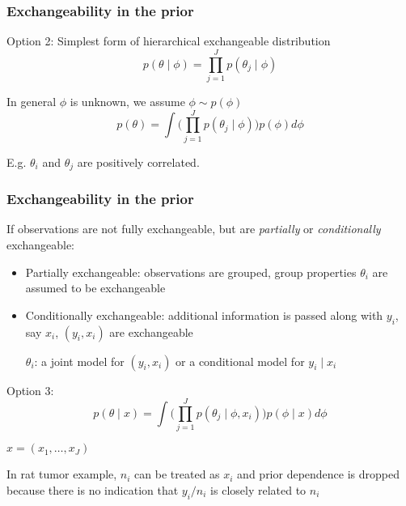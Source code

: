 \documentclass{beamer}
\begin{document}
\begin{frame}
  \frametitle{Exchangeability in the prior}
Option 2: Simplest form of hierarchical exchangeable distribution 
\[
p(\theta \mid \phi) = \prod_{j=1}^J p(\theta_j \mid \phi)
\]

In general $\phi$ is unknown, we assume $\phi \sim p(\phi)$ 
\[
p(\theta) = \int \bigg(\prod_{j=1}^J p(\theta_j \mid \phi)\bigg)
p(\phi) d\phi
\]  

E.g. $\theta_i$ and $\theta_j$ are positively correlated. 
\end{frame}


\begin{frame}
  \frametitle{Exchangeability in the prior}
If observations are not fully exchangeable, but are {\it partially} or
{\it conditionally} exchangeable:

\begin{itemize}
\item Partially exchangeable: observations are grouped, group
  properties $\theta_i$ are assumed to be exchangeable
\item Conditionally exchangeable: additional information is passed
  along with $y_i$, say $x_i$, $(y_i, x_i)$ are exchangeable
 
  $\theta_i$: a joint model for $(y_i, x_i)$ or a conditional model for $y_i \mid x_i$  
\end{itemize}
Option 3: 
\[
p(\theta \mid x) = \int \bigg(\prod_{j=1}^J p(\theta_j \mid \phi, x_i)\bigg)
p(\phi \mid x) d\phi
\]  

$x = (x_1, \ldots, x_J)$

In rat tumor example, $n_i$ can be treated as $x_i$ and prior
dependence is dropped because there is no indication that $y_i/n_i$ is
closely related to $n_i$ 
\end{frame}
\end{document}
